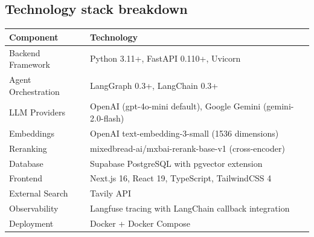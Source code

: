 \documentclass[11pt]{article}
\begin{document}
\subsection{Technology stack breakdown}
\label{app:techstack}
\begin{tabular}{|l|l|}
\hline
Component & Technology \\
\hline
Backend Framework & Python 3.11+, FastAPI 0.110+, Uvicorn \\
Agent Orchestration & LangGraph 0.3+, LangChain 0.3+ \\
LLM Providers & OpenAI (gpt-4o-mini default), Google Gemini (gemini-2.0-flash) \\
Embeddings & OpenAI text-embedding-3-small (1536 dimensions) \\
Reranking & mixedbread-ai/mxbai-rerank-base-v1 (cross-encoder) \\
Database & Supabase PostgreSQL with pgvector extension \\
Frontend & Next.js 16, React 19, TypeScript, TailwindCSS 4 \\
External Search & Tavily API \\
Observability & Langfuse tracing with LangChain callback integration \\
Deployment & Docker + Docker Compose \\
\hline
\end{tabular}
\end{document}
